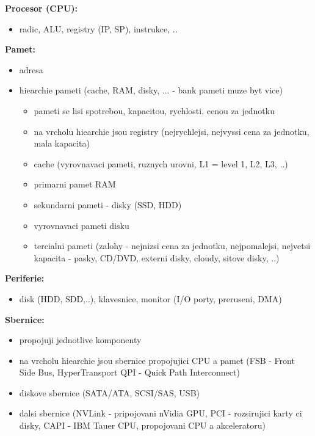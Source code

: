 \documentclass[a4paper, 11pt]{article}
\begin{document}
\noindent\textbf{Procesor (CPU):}
\begin{itemize}
    \item radic, ALU, registry (IP, SP), instrukce, .. \\
\end{itemize}

\noindent\textbf{Pamet:} \label{hiearchie-pameti}
\begin{itemize}
    \item adresa
    \item hiearchie pameti (cache, RAM, disky, ... - bank pameti muze byt vice)
    \begin{itemize}
        \item pameti se lisi spotrebou, kapacitou, rychlosti, cenou za jednotku
        \item na vrcholu hiearchie jsou registry (nejrychlejsi, nejvyssi cena za jednotku, mala kapacita)
        \item cache (vyrovnavaci pameti, ruznych urovni, L1 = level 1, L2, L3, ..)
        \item primarni pamet RAM
        \item sekundarni pameti - disky (SSD, HDD)
        \item vyrovnavaci pameti disku
        \item tercialni pameti (zalohy - nejnizsi cena za jednotku, nejpomalejsi, nejvetsi kapacita - pasky, CD/DVD, externi disky, cloudy, sitove disky, ..) \\
    \end{itemize}
\end{itemize}

\noindent\textbf{Periferie:}
\begin{itemize}
    \item disk (HDD, SDD,..), klavesnice, monitor (I/O porty, preruseni, DMA) \\
\end{itemize}

\noindent\textbf{Sbernice:}
\begin{itemize}
    \item propojuji jednotlive komponenty
    \item na vrcholu hiearchie jsou sbernice propojujici CPU a pamet (FSB - Front Side Bus, HyperTransport QPI - Quick Path Interconnect)
    \item diskove sbernice (SATA/ATA, SCSI/SAS, USB)
    \item dalsi sbernice (NVLink - pripojovani nVidia GPU, PCI - rozsirujici karty ci disky, CAPI - IBM Tauer CPU, propojovani CPU a akceleratoru) \\
\end{itemize}
 
\end{document}
